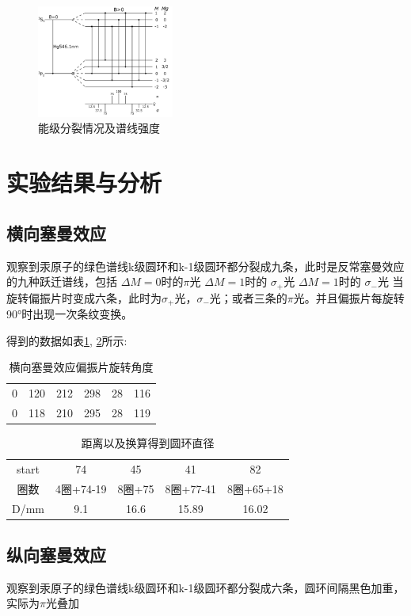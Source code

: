 \documentclass{buaaemp}
\begin{document}
\begin{figure}[!h]
\centering
\includegraphics[width=0.4\textwidth]{fig3.pdf}
\caption{能级分裂情况及谱线强度}\label{fig3}
\end{figure}

\enlargethispage{-3.3cm}

\section{实验结果与分析}
\subsection{横向塞曼效应}
观察到汞原子的绿色谱线k级圆环和k-1级圆环都分裂成九条，此时是反常塞曼效应的九种跃迁谱线，包括 $\Delta M=0$时的$
\pi$光  $\Delta M=1$时的 $\sigma_+$光 $\Delta M=1$时的 $\sigma_-$光 当旋转偏振片时变成六条，此时为$\sigma_+$光，$\sigma_-$光；或者三条的$
\pi$光。并且偏振片每旋转90°时出现一次条纹变换。

得到的数据如表\ref{tab:zeeman}, \ref{tab:radius}所示:
\begin{table}[]
    \centering
    \begin{tabular}{cccccc}
         0& 120 &212 &298 &28 &116 \\
         0& 118 &210 &295 &28 &119
    \end{tabular}
    \caption{横向塞曼效应偏振片旋转角度}
    \label{tab:zeeman}
\end{table}

\begin{table}[]
    \centering
    \begin{tabular}{ccccc}
        start & 74 & 45& 41&82  \\
        圈数 & 4圈+74-19 & 8圈+75 &  8圈+77-41 & 8圈+65+18 \\
        D/mm & 9.1 & 16.6 & 15.89 & 16.02
    \end{tabular}
    \caption{距离以及换算得到圆环直径}
    \label{tab:radius}
\end{table}

\subsection{纵向塞曼效应}
观察到汞原子的绿色谱线k级圆环和k-1级圆环都分裂成六条，圆环间隔黑色加重，实际为$
\pi$光叠加
\end{document}
